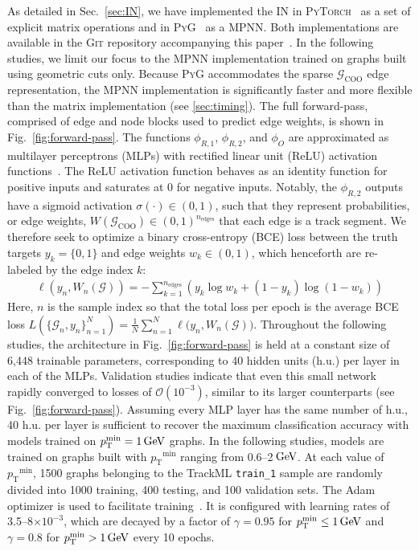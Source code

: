 \documentclass[twocolumn]{svjour3}
\newcommand{\pt}{\ensuremath{p_{\mathrm{T}}}\xspace}
\newcommand{\GeV}{\ensuremath{\,\text{Ge\hspace{-.08em}V}}\xspace}
\newcommand{\nedges}{\ensuremath{n_\mathrm{edges}\xspace}}
\begin{document}
As detailed in Sec.~\ref{sec:IN}, we have implemented the IN in \textsc{PyTorch}~\cite{pytorch} as a set of explicit matrix operations and in \textsc{PyG}~\cite{fey2019fast} as a MPNN. 
Both implementations are available in the \textsc{Git} repository accompanying this paper~\cite{IN_repo}. 
In the following studies, we limit our focus to the MPNN implementation trained on graphs built using geometric cuts only. 
Because \textsc{PyG} accommodates the sparse $\mathcal{G}_\mathrm{COO}$ edge representation, the MPNN implementation is significantly faster and more flexible than the matrix implementation (see \ref{sec:timing}). 
The full forward-pass, comprised of edge and node blocks used to predict edge weights, is shown in Fig.~\ref{fig:forward-pass}. 
The functions $\phi_{R,1}$, $\phi_{R,2}$, and $\phi_O$ are approximated as multilayer perceptrons (MLPs) with rectified linear unit (ReLU) activation functions~\cite{relu1,relu2}. 
The ReLU activation function behaves as an identity function for positive inputs and saturates at 0 for negative inputs. 
Notably, the $\phi_{R,2}$ outputs have a sigmoid activation $\sigma(\cdot)\in(0,1)$, such that they represent probabilities, or edge weights,  $W(\mathcal{G}_\mathrm{COO})\in(0,1)^{\nedges}$ that each edge is a track segment. 
We therefore seek to optimize a binary cross-entropy (BCE) loss between the truth targets $y_k=\{0,1\}$ and edge weights $w_k\in(0,1)$, which henceforth are re-labeled by the edge index $k$:
\begin{align}
    \ell\left(y_n, W_n(\mathcal{G})\right) = -\sum_{k=1}^{\nedges}\left( y_k\log w_k + (1-y_k)\log (1-w_k)\right)
\end{align}
Here, $n$ is the sample index so that the total loss per epoch is the average BCE loss $L(\{\mathcal{G}_n, y_n\}_{n=1}^N)=\frac{1}{N}\sum_{n=1}^N \ell\big(y_n, W_n(\mathcal{G})\big)$. 
Throughout the following studies, the architecture in Fig.~\ref{fig:forward-pass} is held at a constant size of 6,448 trainable parameters, corresponding to 40 hidden units (h.u.) per layer in each of the MLPs.
Validation studies indicate that even this small network rapidly converged to losses of $\mathcal{O}(10^{-3})$, similar to its larger counterparts (see Fig.~\ref{fig:forward-pass}). 
Assuming every MLP layer has the same number of h.u., 40 h.u. per layer is sufficient to recover the maximum classification accuracy with models trained on $\pt^\mathrm{min}=1\GeV$ graphs.
In the following studies, models are trained on graphs built with $\pt^\mathrm{min}$ ranging from 0.6--2\GeV. 
At each value of $\pt^\mathrm{min}$, 1500 graphs belonging to the TrackML \texttt{train\_1} sample are randomly divided into 1000 training, 400 testing, and 100 validation sets. 
The Adam optimizer is used to facilitate training~\cite{adam}. 
It is configured with learning rates of 3.5--8$\times10^{-3}$, which are decayed by a factor of $\gamma=0.95$ for $\pt^\mathrm{min}\leq 1\GeV$ and $\gamma=0.8$ for $\pt^\mathrm{min}> 1\GeV$ every 10 epochs.
\end{document}
